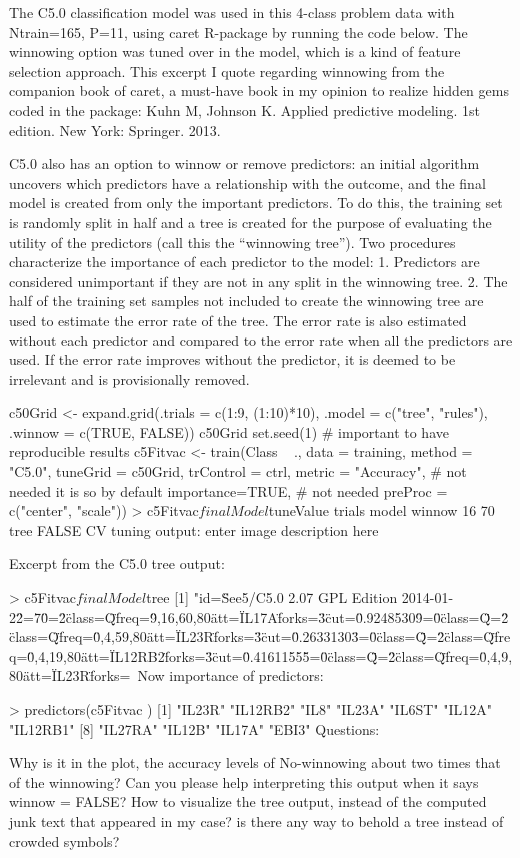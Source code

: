 \documentclass[caret-main.tex]{subfiles}
\begin{document}
The C5.0 classification model was used in this 4-class problem data with Ntrain=165, P=11, using caret R-package by running the code below. The winnowing option was tuned over in the model, which is a kind of feature selection approach. This excerpt I quote regarding winnowing from the companion book of caret, a must-have book in my opinion to realize hidden gems coded in the package:
Kuhn M, Johnson K. Applied predictive modeling. 1st edition. New York: Springer. 2013.

C5.0 also has an option to winnow or remove predictors: an initial algorithm uncovers which predictors have a relationship with the outcome, and the ﬁnal model is created from only the important predictors. To do this, the training set is randomly split in half and a tree is created for the purpose of evaluating the utility of the predictors (call this the “winnowing tree”). Two procedures characterize the importance of each predictor to the model: 1. Predictors are considered unimportant if they are not in any split in the winnowing tree. 2. The half of the training set samples not included to create the winnowing tree are used to estimate the error rate of the tree. The error rate is also estimated without each predictor and compared to the error rate when all the predictors are used. If the error rate improves without the predictor, it is deemed to be irrelevant and is provisionally removed.

c50Grid <- expand.grid(.trials = c(1:9, (1:10)*10),
                       .model = c("tree", "rules"),
                       .winnow = c(TRUE, FALSE))
c50Grid
set.seed(1) # important to have reproducible results
c5Fitvac <- train(Class ~ .,
                   data = training,
                   method = "C5.0",
                   tuneGrid = c50Grid,
                   trControl = ctrl,
                   metric = "Accuracy", # not needed it is so by default
                   importance=TRUE, # not needed
                   preProc = c("center", "scale"))  
> c5Fitvac$finalModel$tuneValue
   trials model winnow
16     70  tree  FALSE  
CV tuning output:
enter image description here

Excerpt from the C5.0 tree output:

> c5Fitvac$finalModel$tree
[1] "id=\"See5/C5.0 2.07 GPL Edition 2014-01-22\"\nentries=\"70\"\ntype=\"2\" class=\"Q\" freq=\"9,16,60,80\" att=\"IL17A\" forks=\"3\" cut=\"0.92485309\"\ntype=\"0\" class=\"Q\"\ntype=\"2\" class=\"Q\" freq=\"0,4,59,80\" att=\"IL23R\" forks=\"3\" cut=\"0.26331303\"\ntype=\"0\" class=\"Q\"\ntype=\"2\" class=\"Q\" freq=\"0,4,19,80\" att=\"IL12RB2\" forks=\"3\" cut=\"0.41611555\"\ntype=\"0\" class=\"Q\"\ntype=\"2\" class=\"Q\" freq=\"0,4,9,80\" att=\"IL23R\" forks=\   
Now importance of predictors:

> predictors(c5Fitvac )
 [1] "IL23R"   "IL12RB2" "IL8"     "IL23A"   "IL6ST"   "IL12A"   "IL12RB1"
 [8] "IL27RA"  "IL12B"   "IL17A"   "EBI3"
Questions:

Why is it in the plot, the accuracy levels of No-winnowing about two times that of the winnowing? Can you please help interpreting this output when it says winnow = FALSE?
How to visualize the tree output, instead of the computed junk text that appeared in my case? is there any way to behold a tree instead of crowded symbols?
\end{document}
